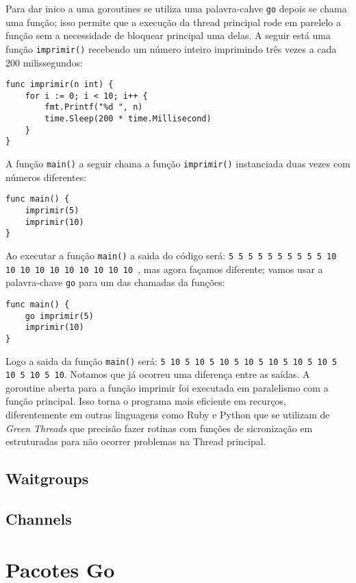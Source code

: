 \documentclass{SBCbookchapter}
\begin{document}
Para dar inico a uma goroutines se utiliza uma palavra-cahve \texttt{go} depois se chama uma função; isso permite que a execução da thread principal rode em parelelo a função sem a necessidade de bloquear principal uma delas.
A seguir está uma função \texttt{imprimir()} recebendo um número inteiro imprimindo três vezes a cada 200 milissegundos:

\begin{lstlisting}
func imprimir(n int) {
	for i := 0; i < 10; i++ {
		fmt.Printf("%d ", n)
		time.Sleep(200 * time.Millisecond)
	}
}
\end{lstlisting}

A função \texttt{main()} a seguir chama a função \texttt{imprimir()} instanciada duas vezes com números diferentes:

\begin{lstlisting}
func main() {
	imprimir(5)
	imprimir(10)
}
\end{lstlisting}

Ao executar a função \texttt{main()} a saida do código será: \texttt{5 5 5 5  5 5 5 5 5 5 10 10 10 10 10 10 10 10 10 10 }, mas agora façamos diferente; vamos usar a palavra-chave \texttt{go} para um das chamadas da funções:

\begin{lstlisting}
func main() {
	go imprimir(5)
	imprimir(10)
}
\end{lstlisting}

Logo a saida da função \texttt{main()} será: \texttt{5 10 5 10 5 10 5 10 5 10 5 10 5 10 5 10 5 10 5 10}. Notamos que já ocorreu uma diferença entre as saídas. A goroutine aberta para a função imprimir foi executada em paralelismo com a função principal. Isso torna o programa mais eficiente em recurços, diferentemente em outras linguagens como Ruby e Python que se utilizam de \textit{Green Threads} que precisão fazer rotinas com funções de sicronização em estruturadas para não ocorrer problemas na Thread principal. 


\subsection{Waitgroups}
\subsection{Channels}

\section{Pacotes Go}
\end{document}
